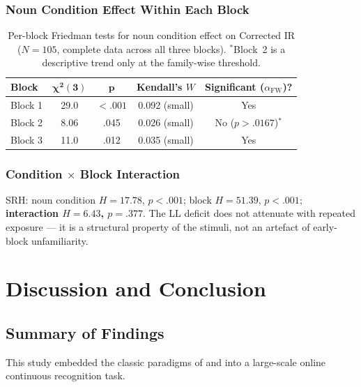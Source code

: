 \documentclass[12pt, a4paper]{article}
\begin{document}
\subsubsection{Noun Condition Effect Within Each Block}

\begin{table}[htbp]
  \centering\small
  \begin{tabular}{lcccc}
    \toprule
    \textbf{Block} & $\boldsymbol{\chi^2(3)}$ & $\boldsymbol{p}$ &
    \textbf{Kendall's $W$} & \textbf{Significant ($\alpha_{\text{FW}}$)?} \\
    \midrule
    Block 1 & 29.0 & $<.001$ & 0.092 (small) & Yes \\
    Block 2 & 8.06 & .045    & 0.026 (small) & No ($p > .0167$)$^*$ \\
    Block 3 & 11.0 & .012    & 0.035 (small) & Yes \\
    \bottomrule
  \end{tabular}
  \caption{Per-block Friedman tests for noun condition effect on
  Corrected IR ($N = 105$, complete data across all three blocks).
  $^*$Block~2 is a descriptive trend only at the family-wise threshold.}
  \label{tab:block_omnibus}
\end{table}

\subsubsection{Condition $\times$ Block Interaction}

SRH: noun condition $H = 17.78$, $p < .001$; block $H = 51.39$,
$p < .001$; \textbf{interaction $H = 6.43$, $p = .377$}. The LL deficit
does not attenuate with repeated exposure --- it is a structural property
of the stimuli, not an artefact of early-block unfamiliarity.

\section{Discussion and Conclusion}

\subsection{Summary of Findings}

This study embedded the classic paradigms of \citet{begg1971} and
\citet{james1973} into a large-scale online continuous recognition task.
\end{document}

